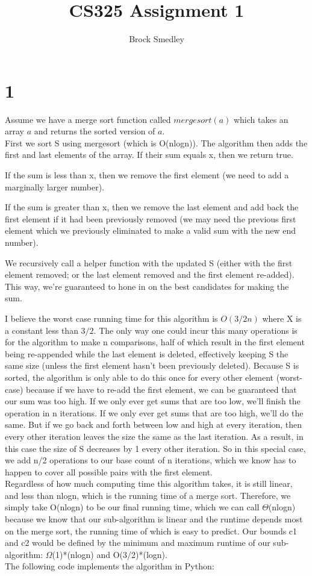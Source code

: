 \documentclass[10pt,a4paper]{report}
\author{Brock Smedley}
\title{CS325 Assignment 1}
\begin{document}
	\maketitle
	
	\section*{1}
	Assume we have a merge sort function called $mergesort(a)$ which takes an array $a$ and returns the sorted version of $a$.
	\\
	
	First we sort S using mergesort (which is O(nlogn)).
	The algorithm then adds the first and last elements of the array. If their sum equals x, then we return true. 
	
	If the sum is less than x, then we remove the first element (we need to add a marginally larger number).
	
	If the sum is greater than x, then we remove the last element and add back the first element if it had been previously removed (we may need the previous first element which we previously eliminated to make a valid sum with the new end number).
	
	We recursively call a helper function with the updated S (either with the first element removed; or the last element removed and the first element re-added).
	This way, we're guaranteed to hone in on the best candidates for making the sum.
	
	I believe the worst case running time for this algorithm is $O(3/2n)$ where X is a constant less than $3/2$. The only way one could incur this many operations is for the algorithm to make n comparisons, half of which result in the first element being re-appended while the last element is deleted, effectively keeping S the same size (unless the first element hasn't been previously deleted). Because S is sorted, the algorithm is only able to do this once for every other element (worst-case) because if we have to re-add the first element, we can be guaranteed that our sum was too high. If we only ever get sums that are too low, we'll finish the operation in n iterations. If we only ever get sums that are too high, we'll do the same. But if we go back and forth between low and high at every iteration, then every other iteration leaves the size the same as the last iteration. As a result, in this case the size of S decreases by 1 every other iteration. So in this special case, we add n/2 operations to our base count of n iterations, which we know has to happen to cover all possible pairs with the first element.
	\\
	Regardless of how much computing time this algorithm takes, it is still linear, and less than nlogn, which is the running time of a merge sort. Therefore, we simply take O(nlogn) to be our final running time, which we can call $\Theta$(nlogn) because we know that our sub-algorithm is linear and the runtime depends most on the merge sort, the running time of which is easy to predict. Our bounds c1 and c2 would be defined by the minimum and maximum runtime of our sub-algorithm: $\Omega$(1)*(nlogn) and O(3/2)*(logn).
	\\
	\newpage
	The following code implements the algorithm in Python:
	
\end{document}
